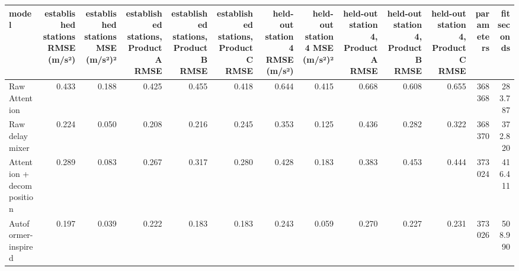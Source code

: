 \begin{tabular}{lrrrrrrrrrrrr}
\toprule
model & established stations RMSE (m/s²) & established stations MSE (m/s²)² & established stations, Product A RMSE & established stations, Product B RMSE & established stations, Product C RMSE & held-out station 4 RMSE (m/s²) & held-out station 4 MSE (m/s²)² & held-out station 4, Product A RMSE & held-out station 4, Product B RMSE & held-out station 4, Product C RMSE & parameters & fit seconds \\
\midrule
Raw Attention & 0.433 & 0.188 & 0.425 & 0.455 & 0.418 & 0.644 & 0.415 & 0.668 & 0.608 & 0.655 & 368368 & 283.787 \\
Raw delay mixer & 0.224 & 0.050 & 0.208 & 0.216 & 0.245 & 0.353 & 0.125 & 0.436 & 0.282 & 0.322 & 368370 & 372.820 \\
Attention + decomposition & 0.289 & 0.083 & 0.267 & 0.317 & 0.280 & 0.428 & 0.183 & 0.383 & 0.453 & 0.444 & 373024 & 416.411 \\
Autoformer-inspired & 0.197 & 0.039 & 0.222 & 0.183 & 0.183 & 0.243 & 0.059 & 0.270 & 0.227 & 0.231 & 373026 & 508.990 \\
\bottomrule
\end{tabular}
